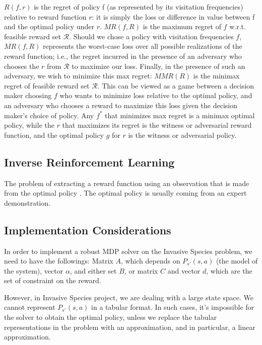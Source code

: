 \documentclass{article}
\theoremstyle{remark}
\theoremstyle{remark}
\theoremstyle{remark}
\theoremstyle{remark}
\theoremstyle{remark}
\theoremstyle{remark}
\begin{document}
$R(f,r)$ is the regret of policy f (as represented by its visitation frequencies) relative to reward function $r$: it is simply the loss or difference in value between f and the optimal policy under $r$. $MR(f,R)$ is the maximum regret of $f$ w.r.t. feasible reward set $\mathcal{R}$. Should we chose a policy with visitation frequencies $f$, $MR(f,R)$ represents the worst-case loss over all possible realizations of the reward function; i.e., the regret incurred in the presence of an adversary who chooses the $r$ from $\mathcal{R}$ to maximize our loss. Finally, in the presence of such an adversary, we wish to minimize this max regret: $MMR(R)$ is the minimax regret of feasible reward set $\mathcal{R}$. This can be viewed as a game between a decision maker choosing $f$ who wants to minimize loss relative to the optimal policy, and an adversary who chooses a reward to maximize this loss given the decision maker’s choice of policy. Any $f^*$ that minimizes max regret is a minimax optimal policy, while the $r$ that maximizes its regret is the witness or adversarial reward function, and the optimal policy $g$ for $r$ is the witness or adversarial policy.



\subsection*{Inverse Reinforcement Learning} 

The problem of extracting a reward function using an observation that is made from the optimal policy \cite{alg_for_irl_Ng}. The optimal policy is usually coming from an expert demonstration.

\subsection*{Implementation Considerations}

In order to implement a robust MDP solver on the Invasive Species problem, we need to have the followings: 
Matrix $A$, which depends on $P_{s'}(s,a)$ (the model of the system), vector $\alpha$, and either set $B$, or matrix $C$ and vector $d$, which are the set of constraint on the reward.


However, in Invasive Species project, we are dealing with a large state space. We cannot represent $P_{s'}(s,a)$ in a tabular format. In such cases, it's impossible for the solver to obtain the optimal policy, unless we replace the tabular representations in the problem with an approximation, and in particular, a linear approximation.
\end{document}
